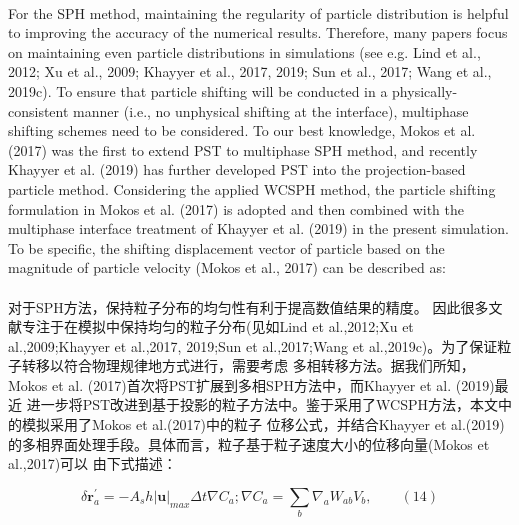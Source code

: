 \documentclass[UTF8]{ctexart}
\begin{document}
{{\paragraph{\quad}For the SPH method, maintaining the regularity 
                of particle distribution is helpful to improving 
                the accuracy of the numerical results. Therefore, 
                many papers focus on maintaining even particle 
                distributions in simulations 
                (see e.g. Lind et al., 2012; Xu et al., 2009; Khayyer et al., 2017, 2019; Sun et al., 2017; Wang et al., 2019c). 
                To ensure that particle shifting will be conducted in 
                a physically-consistent manner (i.e., no unphysical shifting at the interface), 
                multiphase shifting schemes need to be considered. 
                To our best knowledge, Mokos et al. (2017) was the first 
                to extend PST to multiphase SPH method, and recently Khayyer 
                et al. (2019) has further developed PST into the projection-based 
                particle method. Considering the applied WCSPH method, 
                the particle shifting formulation in Mokos et al. (2017) 
                is adopted and then combined with the multiphase interface 
                treatment of Khayyer et al. (2019) in the present simulation. 
                To be specific, the shifting displacement vector of particle 
                based on the magnitude of particle velocity (Mokos et al., 2017) 
                can be described as:
\paragraph{\quad}对于SPH方法，保持粒子分布的均匀性有利于提高数值结果的精度。
                因此很多文献专注于在模拟中保持均匀的粒子分布(见如Lind et al.,2012;Xu et al.,2009;Khayyer et al.,2017,
                2019;Sun et al.,2017;Wang et al.,2019c)。为了保证粒子转移以符合物理规律地方式进行，需要考虑
                多相转移方法。据我们所知，Mokos et al. (2017)首次将PST扩展到多相SPH方法中，而Khayyer et al. (2019)最近
                进一步将PST改进到基于投影的粒子方法中。鉴于采用了WCSPH方法，本文中的模拟采用了Mokos et al.(2017)中的粒子
                位移公式，并结合Khayyer et al.(2019)的多相界面处理手段。具体而言，粒子基于粒子速度大小的位移向量(Mokos et al.,2017)可以
                由下式描述：

\begin{equation}
   \delta \mathbf{r}^{'}_a = -A_s h |\mathbf{u}|_{max} \Delta t \nabla C_a;\nabla C_a = \sum_{b}\nabla_a W_{ab} V_b , \qquad (14)
   \end{equation}

}}
\end{document}
